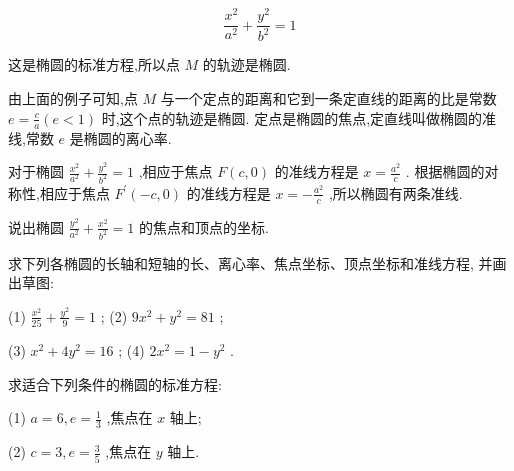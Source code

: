 \documentclass[lang=cn,newtx,10.5pt,scheme=chinese]{elegantbook}
\begin{document}
\[
  \frac{{x}^{2}}{{a}^{2}} + \frac{{y}^{2}}{{b}^{2}} = 1
\]

这是椭圆的标准方程,所以点 \(M\) 的轨迹是椭圆.

由上面的例子可知,点 \(M\) 与一个定点的距离和它到一条定直线的距离的比是常数 \(e = \frac{c}{a}\left( {e < 1}\right)\) 时,这个点的轨迹是椭圆. 定点是椭圆的焦点,定直线叫做椭圆的准线,常数 \(e\) 是椭圆的离心率.

对于椭圆 \(\frac{{x}^{2}}{{a}^{2}} + \frac{{y}^{2}}{{b}^{2}} = 1\) ,相应于焦点 \(F\left( {c,0}\right)\) 的准线方程是 \(x = \frac{{a}^{2}}{c}\) . 根据椭圆的对称性,相应于焦点 \({F}^{\prime }\left( {-c,0}\right)\) 的准线方程是 \(x = - \frac{{a}^{2}}{c}\) ,所以椭圆有两条准线.

\begin{problemset}[练习]

\item 说出椭圆 \(\frac{{y}^{2}}{{a}^{2}} + \frac{{x}^{2}}{{b}^{2}} = 1\) 的焦点和顶点的坐标.

\item 求下列各椭圆的长轴和短轴的长、离心率、焦点坐标、顶点坐标和准线方程, 并画出草图:

(1) \(\frac{{x}^{2}}{25} + \frac{{y}^{2}}{9} = 1\) ; (2) \(9{x}^{2} + {y}^{2} = {81}\) ;

(3) \({x}^{2} + 4{y}^{2} = {16}\) ; (4) \(2{x}^{2} = 1 - {y}^{2}\) .

\item 求适合下列条件的椭圆的标准方程:

(1) \(a = 6,e = \frac{1}{3}\) ,焦点在 \(x\) 轴上;

(2) \(c = 3,e = \frac{3}{5}\) ,焦点在 \(y\) 轴上.

\end{problemset}
\end{document}
